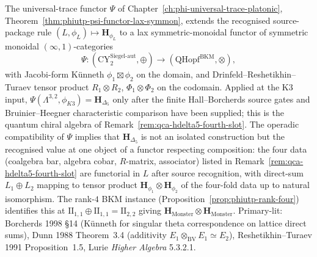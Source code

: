 \begin{remark}
\label{rem:qca-psi-functor-of-operads}
The universal-trace functor $\Psi$ of
Chapter~\ref{ch:phi-universal-trace-platonic},
Theorem~\ref{thm:phiutp-psi-functor-lax-symmon}, extends the recognised
source-package rule $(L, \phi_L) \mapsto \mathbf{H}_{\phi_L}$ to a lax
symmetric-monoidal functor of symmetric monoidal $(\infty,1)$-categories
\[
 \Psi\colon (\mathrm{CY}^{\mathrm{Siegel\text{-}aut}}_2, \oplus)
 \longrightarrow
 (\mathrm{QHopf}^{\mathrm{BKM}}, \otimes),
\]
with Jacobi-form K\"unneth $\phi_1 \boxtimes \phi_2$ on the domain, and
Drinfeld--Reshetikhin--Turaev tensor product $R_1 \otimes R_2$,
$\Phi_1 \otimes \Phi_2$ on the codomain. Applied at the K3 input,
$\Psi(\Lambda^{3,2}, \phi_{K3}) = \mathbf{H}_{\Delta_5}$ only after
the finite Hall--Borcherds source gates and Bruinier--Heegner
characteristic comparison have been supplied; this is the quantum
chiral algebra of
Remark~\ref{rem:qca-hdelta5-fourth-slot}. The operadic compatibility of
$\Psi$ implies that $\mathbf{H}_{\Delta_5}$ is not an isolated construction
but the recognised value at one object of a functor respecting composition:
the four data (coalgebra bar, algebra cobar, $R$-matrix, associator) listed
in Remark~\ref{rem:qca-hdelta5-fourth-slot} are functorial in $L$ after
source recognition,
with direct-sum $L_1 \oplus L_2$ mapping to tensor product
$\mathbf{H}_{\phi_1} \otimes \mathbf{H}_{\phi_2}$ of the four-fold data
up to natural isomorphism. The rank-$4$ BKM instance
(Proposition~\ref{prop:phiutp-rank-four}) identifies this at
$\mathrm{II}_{1,1} \oplus \mathrm{II}_{1,1} = \mathrm{II}_{2,2}$ giving
$\mathbf{H}_{\mathrm{Monster}} \otimes \mathbf{H}_{\mathrm{Monster}}$.
Primary-lit: Borcherds 1998 \S14 (K\"unneth for singular theta
correspondence on lattice direct sums), Dunn 1988 Theorem~3.4
(additivity $E_1 \otimes_{\mathrm{BV}} E_1 \simeq E_2$),
Reshetikhin--Turaev 1991 Proposition~1.5, Lurie \emph{Higher Algebra}
5.3.2.1.
\end{remark}

